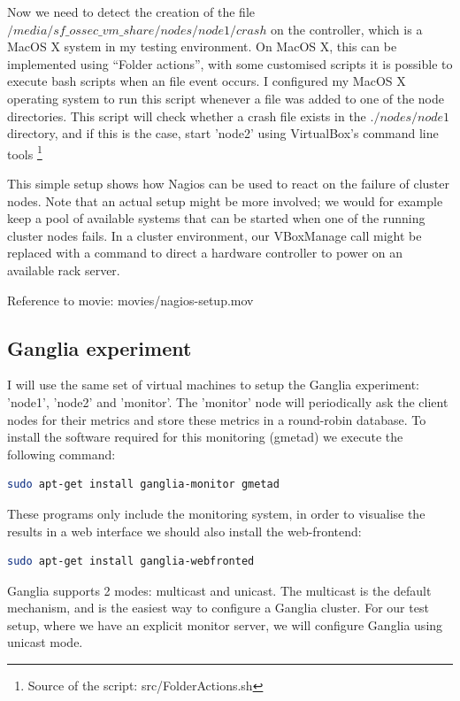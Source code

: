 \documentclass[12pt]{report}
\begin{document}
Now we need to detect the creation of the file
$/media/sf\_ossec\_vm\_share/nodes/node1/crash$  on the controller,
which is a MacOS X system in my testing environment. On MacOS X, this
can be implemented using ``Folder actions'', with some customised scripts
\cite{folder_actions_bash} it is possible to execute bash scripts when
an file event occurs.
I configured my MacOS X operating system to run this script whenever a
file was added to one of the node directories.
This script will check whether a crash file exists in the $./nodes/node1$
directory, and if this is the case, start 'node2' using VirtualBox's
command line tools \footnote{Source of the script: src/FolderActions.sh}

This simple setup shows how Nagios can be used to react on the failure
of cluster nodes. Note that an actual setup might be more
involved; we would for example keep a pool of available systems that
can be started when one of the running cluster nodes fails. In a
cluster environment, our VBoxManage call might be replaced with a
command to direct a hardware controller to power on an available rack
server.

Reference to movie: movies/nagios-setup.mov

\subsection{Ganglia experiment}
I will use the same set of virtual machines to setup the Ganglia
experiment: 'node1', 'node2' and 'monitor'.
The 'monitor' node will periodically ask the client nodes for their
metrics and store these metrics in a round-robin database.
To install the software required for this monitoring (gmetad) we execute the
following command:
\begin{lstlisting}[language=bash]
sudo apt-get install ganglia-monitor gmetad
\end{lstlisting} 

These programs only include the monitoring system, in order to
visualise the results in a web interface we should also install the
web-frontend:
\begin{lstlisting}[language=bash]
sudo apt-get install ganglia-webfronted
\end{lstlisting} 

Ganglia supports 2 modes: multicast and unicast.
The multicast is the default mechanism, and is the easiest way to
configure a Ganglia cluster.
For our test setup, where we have an explicit monitor server, we will
configure Ganglia using unicast mode.
\end{document}
